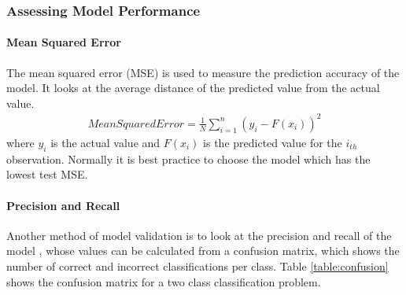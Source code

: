 \documentclass[11pt]{article}
\begin{document}
\subsubsection{Assessing Model Performance}

\paragraph{Mean Squared Error}
The mean squared error (MSE) is used to measure the prediction accuracy of the model. It looks at the average distance of the predicted value from the actual value.
\begin{align}
Mean Squared Error = \frac{1}{N}\sum^{n}_{i = 1} (y_{i}-F(x_{i}))^{2} 
\end{align}
where $y_{i}$ is the actual value and $F(x_{i})$ is the predicted value for the $i_{th}$ observation. Normally it is best practice to choose the model which has the lowest test MSE. \newline
\paragraph{Precision and Recall}
Another method of model validation is to look at the precision and recall of the model \cite{Patel2015}, whose values can be calculated from a confusion matrix, which shows the number of correct and incorrect classifications per class. Table \ref{table:confusion}  shows the confusion matrix for a two class classification problem.
\begin{table}[h] 
\centering      %
\caption{Confusion Matrix} %
\label{table:confusion} %
\end{table} 
\end{document}
